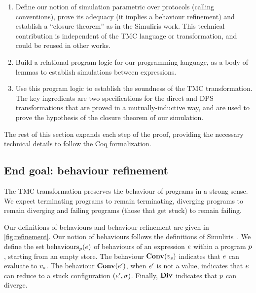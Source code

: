 \begin{enumerate}

\item Define our notion of simulation parametric over protocols (calling conventions), prove its adequacy (it implies a behaviour refinement) and establish a ``closure theorem'' as in the Simuliris work.
%
  This technical contribution is independent of the TMC language or transformation, and could be reused in other works.

\item Build a relational program logic for our programming language, as a body of lemmas to establish simulations between expressions.

\item Use this program logic to establish the soundness of the TMC transformation.
%
The key ingredients are two specifications for the direct and DPS transformations that are proved in a mutually-inductive way, and are used to prove the hypothesis of the closure theorem of our simulation.
\end{enumerate}

The rest of this section expands each step of the proof, providing the necessary technical details to follow the Coq formalization.

\subsection{End goal: behaviour refinement}

The TMC transformation preserves the behaviour of programs in a strong sense.
%
We expect terminating programs to remain terminating, diverging programs to remain diverging and failing programs (those that get stuck) to remain failing.

Our definitions of behaviours and behaviour refinement are given in \cref{fig:refinement}.
%
Our notion of behaviours follows the definitions of Simuliris~\citep*{TODO-simuliris}.
%
We define the set $\mathrm{behaviours}_{\datalangProg} (\datalangExpr)$ of behaviours of an expression $\datalangExpr$ within a program $\datalangProg$, starting from an empty store.
%
The behaviour $\constr{Conv}(\datalangVal_s)$ indicates that $\datalangExpr$ can evaluate to $\datalangVal_s$.
%
The behaviour $\constr{Conv}(\datalangExpr')$, when $\datalangExpr'$ is not a value, indicates that $\datalangExpr$ can reduce to a stuck configuration $(\datalangExpr', \datalangState)$.
%
Finally, $\constr{Div}$ indicates that $\datalangProg$ can diverge.

